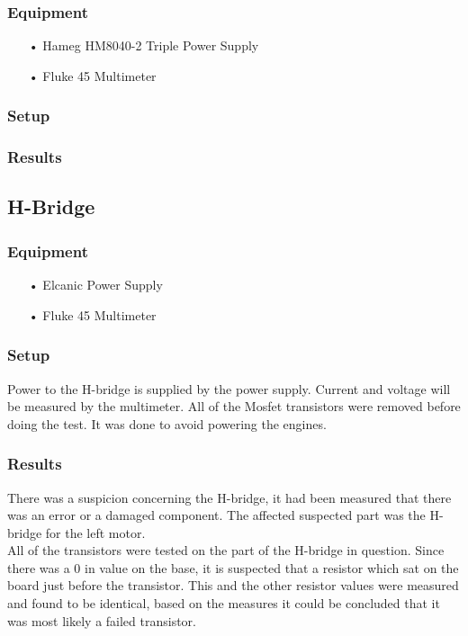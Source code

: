 \subsubsection{Equipment}
\begin{enumerate}
	\item[•]Hameg HM8040-2 Triple Power Supply
	\item[•]Fluke 45 Multimeter
\end{enumerate}

\subsubsection{Setup}

\subsubsection{Results}

\subsection{H-Bridge}

\subsubsection{Equipment}
\begin{enumerate}
	\item[•]Elcanic Power Supply
	\item[•]Fluke 45 Multimeter
\end{enumerate}

\subsubsection{Setup}
Power to the H-bridge is supplied by the power supply. Current and voltage will be measured by the multimeter.
All of the Mosfet transistors were removed before doing the test. It was done to avoid powering the engines.


\subsubsection{Results}
There was a suspicion concerning the H-bridge, it had been measured that there was an error or a damaged component. The affected suspected part was the H-bridge for the left motor.\\

All of the transistors were tested on the part of the H-bridge in question.
Since there was a 0 in value on the base, it is suspected that a resistor which sat on the board just before the transistor. This and the other resistor values were measured and found to be identical, based on the measures it could be concluded that it was most likely a failed transistor.\\

